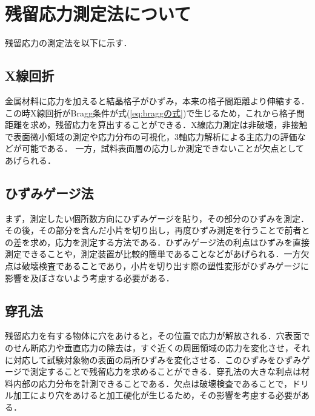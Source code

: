 \section{残留応力測定法について}

残留応力の測定法を以下に示す．

\subsection{X線回折}
金属材料に応力を加えると結晶格子がひずみ，本来の格子間距離より伸縮する．この時X線回折がBragg条件が式(\ref{eq:braggの式})で生じるため，これから格子間距離を求め，残留応力を算出することができる．X線応力測定は非破壊，非接触で表面微小領域の測定や応力分布の可視化，3軸応力解析による主応力の評価などが可能である．
一方，試料表面層の応力しか測定できないことが欠点としてあげられる．

\subsection{ひずみゲージ法}
まず，測定したい個所数方向にひずみゲージを貼り，その部分のひずみを測定．その後，その部分を含んだ小片を切り出し，再度ひずみ測定を行うことで前者との差を求め，応力を測定する方法である．ひずみゲージ法の利点はひずみを直接測定できることや，測定装置が比較的簡単であることなどがあげられる．一方欠点は破壊検査であることであり，小片を切り出す際の塑性変形がひずみゲージに影響を及ぼさないよう考慮する必要がある．
\subsection{穿孔法}
残留応力を有する物体に穴をあけると，その位置で応力が解放される．穴表面でのせん断応力や垂直応力の除去は，すぐ近くの周囲領域の応力を変化させ，それに対応して試験対象物の表面の局所ひずみを変化させる．このひずみをひずみゲージで測定することで残留応力を求めることができる．穿孔法の大きな利点は材料内部の応力分布を計測できることである．欠点は破壊検査であることで，ドリル加工により穴をあけると加工硬化が生じるため，その影響を考慮する必要がある．
